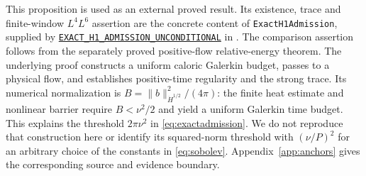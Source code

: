 \documentclass[11pt,a4paper]{article}
\numberwithin{equation}{section}
\theoremstyle{plain}
\theoremstyle{definition}
\theoremstyle{remark}
\newcommand{\HH}[1]{\dot H^{#1}}
\newcommand{\norm}[2]{\lVert #1\rVert_{#2}}
\newcommand{\decl}[1]{\begingroup\small\nolinkurl{#1}\endgroup}
\newcommand{\vanchor}[3]{\href{https://github.com/randogelist/Methboke/blob/fdb515d8bde35ec8021bbc26f360aca8dfa2855c/Material/_vendor/QuasiFeffermanB/#1\#L#2}{\decl{#3}}}
\begin{document}
This proposition is used as an external proved result. Its existence,
trace and finite-window $L^4L^6$ assertion are the concrete content of
\decl{ExactH1Admission}, supplied by
\vanchor{CaloricNumericalAdmission.lean}{53}{EXACT_H1_ADMISSION_UNCONDITIONAL}
in \cite{methlib}. The comparison assertion follows from the separately
proved positive-flow relative-energy theorem. The underlying proof
constructs a uniform caloric Galerkin budget, passes to a physical flow,
and establishes positive-time regularity and the strong trace. Its numerical normalization is
$B=\norm{b}{\HH{1/2}}^2/(4\pi)$: the finite heat estimate and nonlinear
barrier require $B<\nu^2/2$ and yield a uniform Galerkin time budget.
This explains the threshold $2\pi\nu^2$ in \eqref{eq:exactadmission}.
We do not reproduce that construction here or identify its squared-norm threshold with
$(\nu/P)^2$ for an arbitrary choice of the constants in
\eqref{eq:sobolev}. Appendix~\ref{app:anchors} gives the corresponding
source and evidence boundary.
\end{document}
